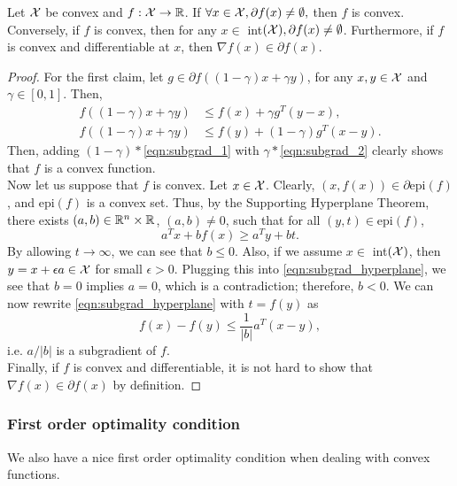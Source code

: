 \begin{proposition}
Let $\mathcal{X}$ be convex and $f : \mathcal{X} \rightarrow \mathbb{R}$. If $\forall x \in \mathcal{X}, \partial f(x) \neq \emptyset,$ then $f$ is convex. Conversely, if $f$ is convex, then for any $x \in $ int$(\mathcal{X}), \partial f(x) \neq \emptyset$. Furthermore, if $f$ is convex and differentiable at $x$, then $\nabla f(x) \in \partial f(x)$. 
\begin{proof}
For the first claim, let $g \in \partial f( (1 - \gamma) x + \gamma y)$, for any $x,y \in \mathcal{X}$ and $\gamma \in [0,1]$. Then,
\begin{align}
f((1 - \gamma) x + \gamma y) &\leq f(x) + \gamma g^T (y - x), \label{eqn:subgrad_1} \\
f((1 - \gamma) x + \gamma y) &\leq f(y) + (1 - \gamma) g^T (x - y). \label{eqn:subgrad_2}
\end{align}
Then, adding $(1 - \gamma) *$\eqref{eqn:subgrad_1} with $\gamma *$\eqref{eqn:subgrad_2} clearly shows that $f$ is a convex function. \\

Now let us suppose that $f$ is convex. Let $x \in \mathcal{X}$. Clearly, $(x, f(x)) \in \partial\mbox{epi}(f)$, and $\mbox{epi}(f)$ is a convex set. Thus, by the Supporting Hyperplane Theorem, there exists $(a, b) \in \mathbb{R}^n \times \mathbb{R}$, $(a, b) \neq 0$, such that for all $(y, t) \in \mbox{epi} (f)$, 
\begin{equation} \label{eqn:subgrad_hyperplane}
a^T x + b f(x) \geq a^T y + bt.
\end{equation}
By allowing $t \rightarrow \infty$, we can see that $b \leq 0$. Also, if we assume $x \in $ int$(\mathcal{X})$, then $y = x + \epsilon a \in \X$ for small $\epsilon > 0$. Plugging this into \eqref{eqn:subgrad_hyperplane}, we see that $b = 0$ implies $a = 0$, which is a contradiction; therefore, $b < 0$. We can now rewrite \eqref{eqn:subgrad_hyperplane} with $t = f(y)$ as 
\[
f(x) - f(y) \leq \frac{1}{|b|} a^T (x - y),
\]
i.e. $a / |b|$ is a subgradient of $f$. \\

Finally, if $f$ is convex and differentiable, it is not hard to show that $\nabla f(x) \in \partial f(x)$ by definition. 
\end{proof}
\end{proposition}

\subsubsection{First order optimality condition}
We also have a nice first order optimality condition when dealing with convex functions.


